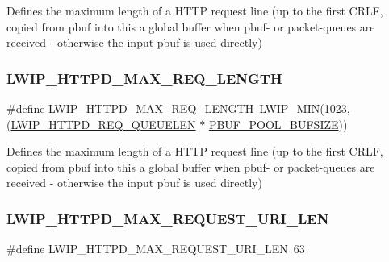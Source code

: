 Defines the maximum length of a H\+T\+TP request line (up to the first C\+R\+LF, copied from pbuf into this a global buffer when pbuf-\/ or packet-\/queues are received -\/ otherwise the input pbuf is used directly) \mbox{\label{group__httpd__opts_ga30dc71c59f3904df7daaf293f74f91f8}} 
\subsubsection{\texorpdfstring{L\+W\+I\+P\+\_\+\+H\+T\+T\+P\+D\+\_\+\+M\+A\+X\+\_\+\+R\+E\+Q\+\_\+\+L\+E\+N\+G\+TH}{LWIP\_HTTPD\_MAX\_REQ\_LENGTH}\hspace{0.1cm}{\footnotesize\ttfamily [2/2]}}
{\footnotesize\ttfamily \#define L\+W\+I\+P\+\_\+\+H\+T\+T\+P\+D\+\_\+\+M\+A\+X\+\_\+\+R\+E\+Q\+\_\+\+L\+E\+N\+G\+TH~\hyperlink{openmote-cc2538_2lwip_2src_2include_2lwip_2def_8h_a748f5df614a3fc989e8900fd229d6e4e}{L\+W\+I\+P\+\_\+\+M\+IN}(1023, (\hyperlink{group__httpd__opts_gaef23f4e3525aa5dd0ecbce9b5e16d4e0}{L\+W\+I\+P\+\_\+\+H\+T\+T\+P\+D\+\_\+\+R\+E\+Q\+\_\+\+Q\+U\+E\+U\+E\+L\+EN} $\ast$ \hyperlink{group__lwip__opts__pbuf_gae61f4491d56e805e79b79eb5d35a00e5}{P\+B\+U\+F\+\_\+\+P\+O\+O\+L\+\_\+\+B\+U\+F\+S\+I\+ZE}))}

Defines the maximum length of a H\+T\+TP request line (up to the first C\+R\+LF, copied from pbuf into this a global buffer when pbuf-\/ or packet-\/queues are received -\/ otherwise the input pbuf is used directly) \mbox{\label{group__httpd__opts_gaca4ef53e7a9abbd8d4bd8bc1ba7b486a}} 
\subsubsection{\texorpdfstring{L\+W\+I\+P\+\_\+\+H\+T\+T\+P\+D\+\_\+\+M\+A\+X\+\_\+\+R\+E\+Q\+U\+E\+S\+T\+\_\+\+U\+R\+I\+\_\+\+L\+EN}{LWIP\_HTTPD\_MAX\_REQUEST\_URI\_LEN}\hspace{0.1cm}{\footnotesize\ttfamily [1/2]}}
{\footnotesize\ttfamily \#define L\+W\+I\+P\+\_\+\+H\+T\+T\+P\+D\+\_\+\+M\+A\+X\+\_\+\+R\+E\+Q\+U\+E\+S\+T\+\_\+\+U\+R\+I\+\_\+\+L\+EN~63}


